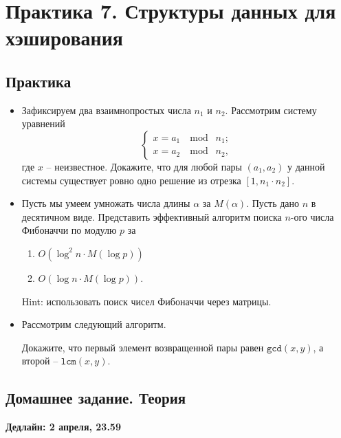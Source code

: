 \section{Практика 7. Структуры данных для хэширования}

\subsection{Практика}

\begin{itemize}

    \item Зафиксируем два взаимнопростых числа $n_1$ и $n_2$. Рассмотрим систему уравнений
            $$
            \left\{
                \begin{array}{l}
                    x = a_1 \;\mod\; n_1; \\
                    x = a_2 \;\mod\; n_2,
                \end{array}        
            \right.
            $$
        где $x$ -- неизвестное. Докажите, что для любой пары $(a_1, a_2)$ у данной системы существует ровно одно решение из отрезка $[1, n_1 \cdot n_2]$.
        
        
    \item Пусть мы умеем умножать числа длины $\alpha$ за $M(\alpha)$. Пусть дано $n$ в десятичном виде. Представить эффективный алгоритм поиска $n$-ого числа Фибоначчи по модулю $p$ за
    \begin{enumerate}
        \item $O(\log^2 n \cdot M(\log p))$
        \item $O(\log n \cdot M(\log p))$.
    \end{enumerate}
    Hint: использовать поиск чисел Фибоначчи через матрицы.

    \item Рассмотрим следующий алгоритм.
    
    Докажите, что первый элемент возвращенной пары равен $\texttt{gcd}(x, y)$, а второй -- $\texttt{lcm}(x, y)$.    


\end{itemize}

\subsection{Домашнее задание. Теория}
\textbf{Дедлайн: 2 апреля, 23.59}

